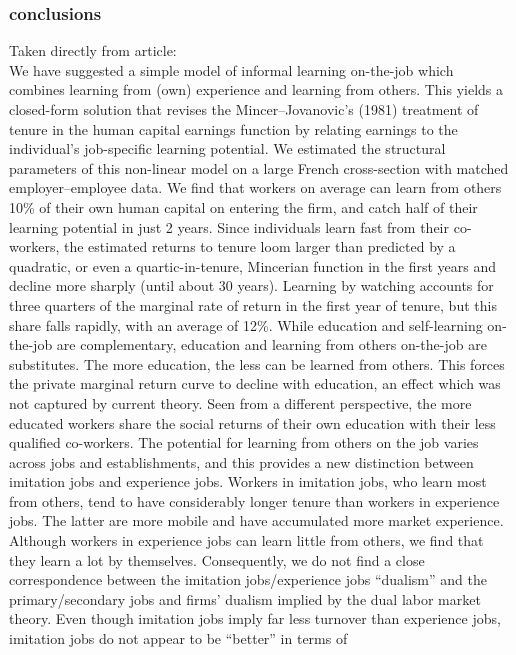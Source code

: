 \documentclass[12pt,a4paper]{article}
\begin{document}
  \subsubsection{conclusions} %
  \label{ssub:conclusions}
  Taken directly from article:\\
  We have suggested a simple model of informal learning on-the-job which combines learning from (own)
  experience and learning from others. This yields a closed-form solution that revises the
  Mincer–Jovanovic’s (1981) treatment of tenure in the human capital earnings function by relating
  earnings to the individual’s job-specific learning potential. We estimated the structural parameters
  of this non-linear model on a large French cross-section with matched employer–employee data. We
  find that workers on average can learn from others 10\% of their own human capital on entering the
  firm, and catch half of their learning potential in just 2 years. Since individuals learn fast from
  their co-workers, the estimated returns to tenure loom larger than predicted by a quadratic, or even
  a quartic-in-tenure, Mincerian function in the first years and decline more sharply (until about 30
  years). Learning by watching accounts for three quarters of the marginal rate of return in the first
  year of tenure, but this share falls rapidly, with an average of 12\%. While education and
  self-learning on-the-job are complementary, education and learning from others on-the-job are
  substitutes. The more education, the less can be learned from others. This forces the private
  marginal return curve to decline with education, an effect which was not captured by current theory.
  Seen from a different perspective, the more educated workers share the social returns of their own
  education with their less qualified co-workers.  The potential for learning from others on the job
  varies across jobs and establishments, and this provides a new distinction between imitation jobs
  and experience jobs. Workers in imitation jobs, who learn most from others, tend to have
  considerably longer tenure than workers in experience jobs. The latter are more mobile and have
  accumulated more market experience. Although workers in experience jobs can learn little from
  others, we find that they learn a lot by themselves. Consequently, we do not find a close
  correspondence between the imitation jobs/experience jobs “dualism” and the primary/secondary jobs
  and firms’ dualism implied by the dual labor market theory. Even though imitation jobs imply far
  less turnover than experience jobs, imitation jobs do not appear to be “better” in terms of
\end{document}
